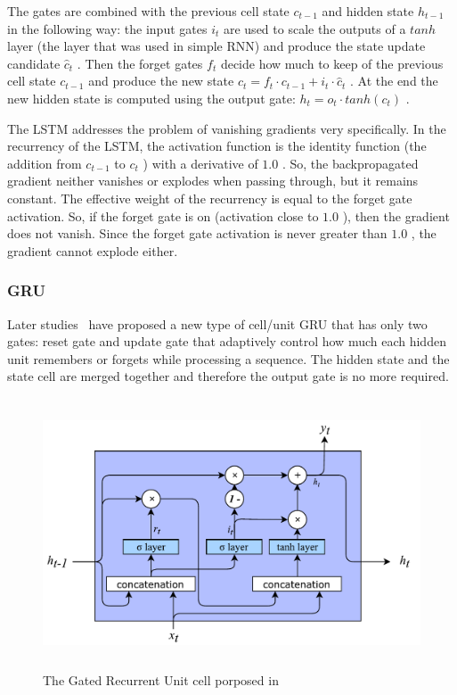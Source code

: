The gates are combined with the previous cell state  \( c_{t-1} \)  and hidden state  \( h_{t-1} \)  in the following way: the input gates  \( i_{t} \) are used to scale the outputs of a  \( tanh \)  layer (the layer that was used in simple RNN) and produce the state update candidate  \( \hat c_{t} \) . Then the forget gates  \( f_{t} \)  decide how much to keep of the previous cell state  \( c_{t-1} \)  and produce the new state  \( c_{t}=f_{t}\cdot c_{t-1}+i_{t}\cdot \hat c_{t} \) . At the end the new hidden state is computed using the output gate:  \( h_{t}=o_{t}\cdot tanh \left( c_{t} \right)  \) .

The LSTM addresses the problem of vanishing gradients very specifically. In the recurrency of the LSTM, the activation function is the identity function (the addition from  \( c_{t-1} \)  to  \( c_{t} \) ) with a derivative of  \( 1.0 \) . So, the backpropagated gradient neither vanishes or explodes when passing through, but it remains constant. The effective weight of the recurrency is equal to the forget gate activation. So, if the forget gate is on (activation close to  \( 1.0 \) ), then the gradient does not vanish. Since the forget gate activation is never greater than  \( 1.0 \) , the gradient cannot explode either.

\subsubsection{GRU}
Later studies~\cite{cho2014learning} have proposed a new type of cell/unit GRU that has only two gates: reset gate and update gate that adaptively control how much each hidden unit remembers or forgets while processing a sequence. The hidden state and the state cell are merged together and therefore the output gate is no more required.


\begin{figure}[!htbp]
    \centering
    \includegraphics[max width=\linewidth,max height=8cm,keepaspectratio]{figures/GRU}
    \caption{The Gated Recurrent Unit cell porposed in~\cite{cho2014learning}}\label{fig:GRU}
\end{figure}

